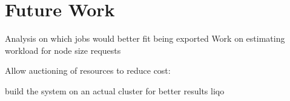 

\chapter{Future Work}

Analysis on which jobs would better fit being exported
Work on estimating workload for node size requests

Allow auctioning of resources to reduce cost:

build the system on an actual cluster for better results
liqo

